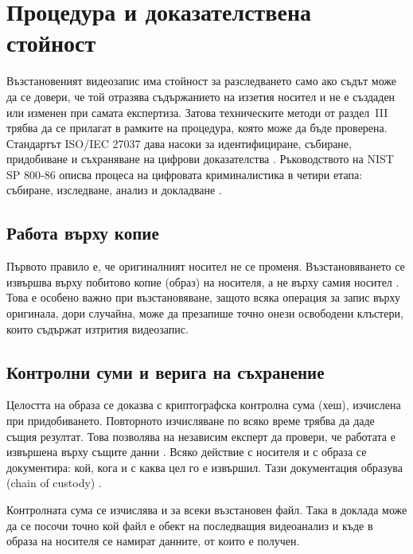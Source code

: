 \section{Процедура и доказателствена стойност}

Възстановеният видеозапис има стойност за разследването само ако съдът може да се
довери, че той отразява съдържанието на иззетия носител и не е създаден или изменен
при самата експертиза. Затова техническите методи от раздел~III трябва да се прилагат
в рамките на процедура, която може да бъде проверена. Стандартът ISO/IEC 27037 дава
насоки за идентифициране, събиране, придобиване и съхраняване на цифрови доказателства
\cite{iso27037}. Ръководството на NIST SP 800-86 описва процеса на цифровата
криминалистика в четири етапа: събиране, изследване, анализ и докладване
\cite{nist80086}.

\subsection{Работа върху копие}

Първото правило е, че оригиналният носител не се променя. Възстановяването се извършва
върху побитово копие (образ) на носителя, а не върху самия носител
\cite{nist80086}. Това е особено важно при възстановяване, защото всяка
операция за запис върху оригинала, дори случайна, може да презапише точно онези
освободени клъстери, които съдържат изтрития видеозапис.

\subsection{Контролни суми и верига на съхранение}

Целостта на образа се доказва с криптографска контролна сума (хеш), изчислена при
придобиването. Повторното изчисляване по всяко време трябва да даде същия резултат. Това
позволява на независим експерт да провери, че работата е извършена върху същите данни
\cite{nist80086}. Всяко действие с носителя и с образа се документира: кой, кога и с
каква цел го е извършил. Тази документация образува 
(chain of custody) \cite{nist80086}.

Контролната сума се изчислява и за всеки възстановен файл. Така в доклада може да се
посочи точно кой файл е обект на последващия видеоанализ и къде в образа на носителя
се намират данните, от които е получен.

